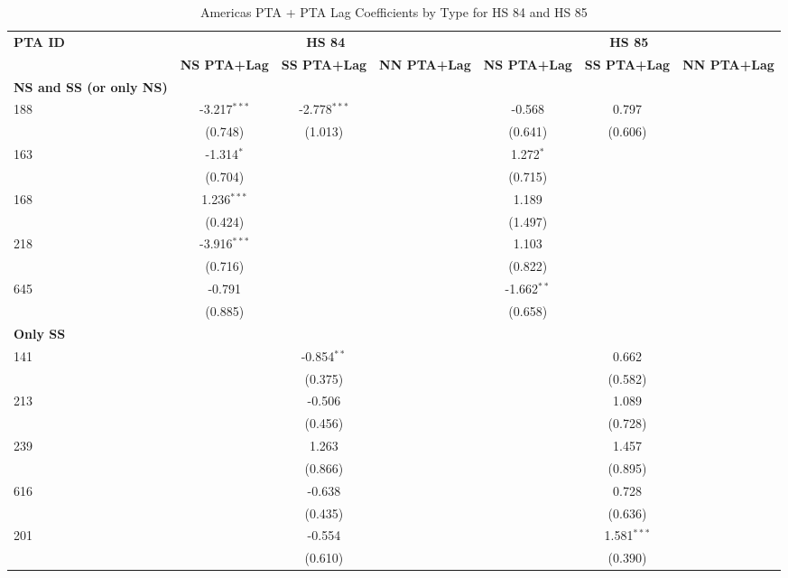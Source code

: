 \begin{table}[htbp]
    \centering
    \caption{Americas PTA + PTA Lag Coefficients by Type for HS 84 and HS 85}
    \label{tab:epuv_americas_pta}
    \begin{adjustbox}{max width=\textwidth}
    \begin{tabular}{lcccccc}
    \hline
    \textbf{PTA ID} & \multicolumn{3}{c}{\textbf{HS 84}} & \multicolumn{3}{c}{\textbf{HS 85}} \\
    & \textbf{NS PTA+Lag} & \textbf{SS PTA+Lag} & \textbf{NN PTA+Lag} & \textbf{NS PTA+Lag} & \textbf{SS PTA+Lag} & \textbf{NN PTA+Lag} \\
    \hline
    \textbf{NS and SS (or only NS)} &  &  &  &  &  &  \\
    \hline
    188 & -3.217$^{\ast\ast\ast}$ & -2.778$^{\ast\ast\ast}$ &  & -0.568 & 0.797 &  \\
    & (0.748) & (1.013) &  & (0.641) & (0.606) &  \\
    163 & -1.314$^{\ast}$ &  &  & 1.272$^{\ast}$ &  &  \\
     & (0.704) &  &  & (0.715) &  &  \\
    168 & 1.236$^{\ast\ast\ast}$ &  &  & 1.189 &  &  \\
     & (0.424) &  &  & (1.497) &  &  \\
    218 & -3.916$^{\ast\ast\ast}$ &  &  & 1.103 &  &  \\
     & (0.716) &  &  & (0.822) &  &  \\
    645 & -0.791 &  &  & -1.662$^{\ast\ast}$ &  &  \\
     & (0.885) &  &  & (0.658) &  &  \\
    \hline
    \textbf{Only SS} &  &  &  &  &  &  \\
    \hline
    141 &  & -0.854$^{\ast\ast}$ &  &  & 0.662 &  \\
     &  & (0.375) &  &  & (0.582) &  \\
    213 &  & -0.506 &  &  & 1.089 &  \\
     &  & (0.456) &  &  & (0.728) &  \\
    239 &  & 1.263 &  &  & 1.457 &  \\
     &  & (0.866) &  &  & (0.895) &  \\
    616 &  & -0.638 &  &  & 0.728 &  \\
     &  & (0.435) &  &  & (0.636) &  \\
    201 &  & -0.554 &  &  & 1.581$^{\ast\ast\ast}$ &  \\
     &  & (0.610) &  &  & (0.390) &  \\

\end{tabular}
\end{adjustbox}
\end{table}
